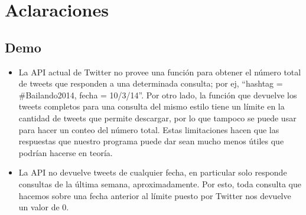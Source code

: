 \section{Aclaraciones} 

\subsection{Demo}

\begin{itemize}
 \item La API actual de Twitter no provee una función para obtener el número total de tweets que responden a una determinada consulta; por ej, ``hashtag = \#Bailando2014, fecha = 10/3/14''. Por otro lado, la función que devuelve los tweets completos para una consulta del mismo estilo tiene un límite en la cantidad de tweets que permite descargar, por lo que tampoco se puede usar para hacer un conteo del número total. Estas limitaciones hacen que las respuestas que nuestro programa puede dar sean mucho menos útiles que podrían hacerse en teoría.
 \item La API no devuelve tweets de cualquier fecha, en particular solo responde consultas de la última semana, aproximadamente. Por esto, toda consulta que hacemos sobre una fecha anterior al límite puesto por Twitter nos devuelve un valor de 0.
\end{itemize}

